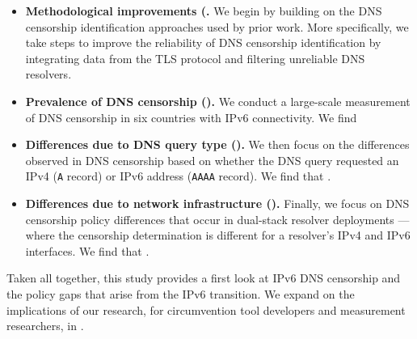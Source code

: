 \begin{itemize}

  \item {\bf Methodological improvements (.} We begin by
    building on the DNS censorship identification approaches used by prior
    work. More specifically, we take steps to improve the reliability of DNS
    censorship identification by integrating data from the TLS protocol and
    filtering unreliable DNS resolvers.

  \item {\bf Prevalence of DNS censorship ().} We conduct
    a large-scale measurement of DNS censorship in six countries with IPv6
    connectivity. We find 

  \item {\bf Differences due to DNS query type ().} We then
    focus on the differences observed in DNS censorship based on whether the
    DNS query requested an IPv4 ({\tt A} record) or IPv6 address ({\tt AAAA}
    record). We find that .

  \item {\bf Differences due to network infrastructure ().}
    Finally, we focus on DNS censorship policy differences that occur in
    dual-stack resolver deployments --- \ie where the censorship determination
    is different for a resolver's IPv4 and IPv6 interfaces. We find that
    .

\end{itemize}

Taken all together, this study provides a first look at IPv6 DNS censorship and
the policy gaps that arise from the IPv6 transition. We expand on the
implications of our research, for circumvention tool developers and measurement
researchers, in .
